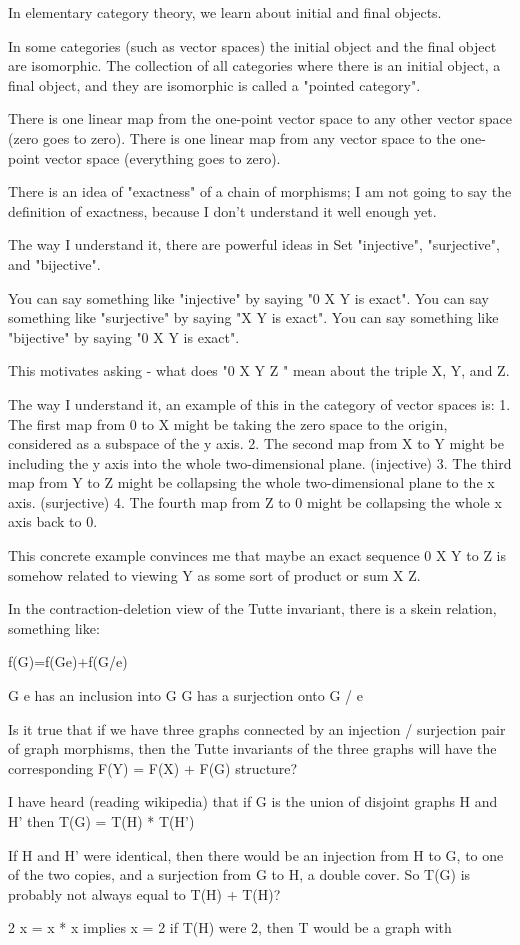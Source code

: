 In elementary category theory, we learn about initial and final objects.

In some categories (such as vector spaces) the initial object and the final object are isomorphic.
The collection of all categories where there is an initial object, a final object, and they are isomorphic is called a "pointed category".

There is one linear map from the one-point vector space to any other vector space (zero goes to zero).
There is one linear map from any vector space to the one-point vector space (everything goes to zero).

There is an idea of "exactness" of a chain of morphisms; I am not going to say the definition of exactness, because I don't understand it well enough yet.

The way I understand it, there are powerful ideas in Set
"injective", "surjective", and "bijective".

You can say something like "injective" by saying "0 \to X \to Y is exact".
You can say something like "surjective" by saying "X \to Y  is exact".
You can say something like "bijective" by saying "0 \to X \to Y  is exact".

This motivates asking - what does "0 \to X \to Y \to Z " mean about the triple X, Y, and Z.

The way I understand it, an example of this in the category of vector spaces is:
1. The first map from 0 to X might be taking the zero space to the origin, considered as a subspace of the y axis.
2. The second map from X to Y might be including the y axis into the whole two-dimensional plane. (injective)
3. The third map from Y to Z might be collapsing the whole two-dimensional plane to the x axis. (surjective)
4. The fourth map from Z to 0 might be collapsing the whole x axis back to 0.

This concrete example convinces me that maybe an exact sequence 0 \to X \to Y to Z  is somehow related to viewing Y as some sort of product or sum X \oplus Z.

In the contraction-deletion view of the Tutte invariant,
there is a skein relation, something like:

f(G)=f(G\setminus e)+f(G/e)

G \setminus e has an inclusion into G
G has a surjection onto G / e

Is it true that if we have three graphs connected by an injection / surjection pair of graph morphisms,
then the Tutte invariants of the three graphs will have the corresponding F(Y) = F(X) + F(G) structure?

I have heard (reading wikipedia) that if G is the union of disjoint graphs H and H' then T(G) = T(H) * T(H')

If H and H' were identical, then there would be an injection from H to G, to one of the two copies,
and a surjection from G to H, a double cover.
So T(G) is probably not always equal to T(H) + T(H)?

2 x = x * x implies x = 2
if T(H) were 2, then T would be a graph with
